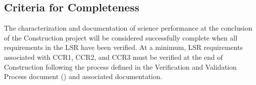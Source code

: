 



\subsection{Criteria for Completeness}

The characterization and documentation of science performance at the conclusion of the Construction project will be considered successfully complete when all requirements in the LSR have been verified.
At a minimum, LSR requirements associated with CCR1, CCR2, and CCR3 must be verified at the end of Construction following the process defined in the Verification and Validation Process document () and associated documentation.

